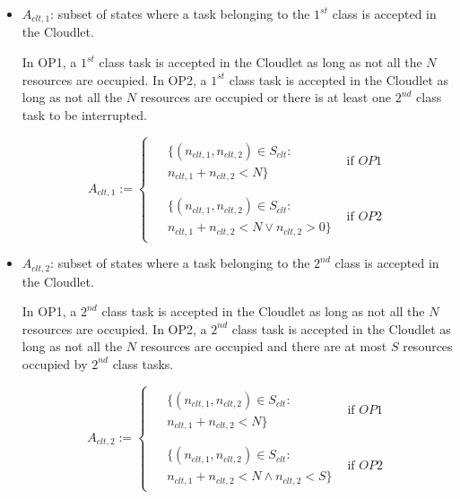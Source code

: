 \begin{itemize}
	\item $A_{clt,1}$:  subset of states where a task belonging to the $1^{st}$ class is accepted in the Cloudlet.
	
	In OP1, a $1^{st}$ class task is accepted in the Cloudlet as long as not all the $N$ resources are occupied.
	In OP2, a $1^{st}$ class task is accepted in the Cloudlet as long as not all the $N$ resources are occupied or there is at least one $2^{nd}$ class task to be interrupted.

	\begin{equation}
		A_{clt,1} :=
		\left\{
		\begin{array}{ll}
			\begin{aligned}
				& \{(n_{clt,1},n_{clt,2})\in S_{clt} : \\
				& n_{clt,1}+n_{clt,2}<N\}
			\end{aligned} & \mbox{if } OP1 \\
			\\
			\begin{aligned}
				& \{(n_{clt,1},n_{clt,2})\in S_{clt} : \\
				& n_{clt,1}+n_{clt,2}<N \vee n_{clt,2}>0\}
			\end{aligned} & \mbox{if } OP2
		\end{array}
		\right.
	\end{equation}
	
	\item $A_{clt,2}$: subset of states where  a task belonging to the $2^{nd}$ class is accepted in the Cloudlet.
	
	In OP1, a $2^{nd}$ class task is accepted in the Cloudlet as long as not all the $N$ resources are occupied.
	In OP2, a $2^{nd}$ class task is accepted in the Cloudlet as long as not all the $N$ resources are occupied and there are at most $S$ resources occupied by $2^{nd}$ class tasks.
	
	\begin{equation}
		A_{clt,2} :=
		\left\{
		\begin{array}{ll}
			\begin{aligned}
				& \{(n_{clt,1},n_{clt,2})\in S_{clt} : \\
				& n_{clt,1}+n_{clt,2}<N\}
			\end{aligned} & \mbox{if } OP1 \\
			\\
			\begin{aligned}
				& \{(n_{clt,1},n_{clt,2})\in S_{clt} : \\
				& n_{clt,1}+n_{clt,2}<N \wedge n_{clt,2}<S\}
			\end{aligned} & \mbox{if } OP2
		\end{array}
		\right.
	\end{equation}
	

\end{itemize}
